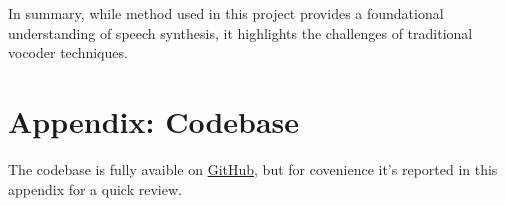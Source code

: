 \documentclass[12pt]{article}
\begin{document}
In summary, while method used in this project provides a foundational understanding of speech synthesis, it highlights the challenges of traditional vocoder techniques.


\newpage



\section{Appendix: Codebase}

The codebase is fully avaible on \href{https://github.com/Griffosx/nlp/blob/main/src/tts/tts_librosa.py}{GitHub}, but for covenience it's reported in this appendix for a quick review.
\end{document}
